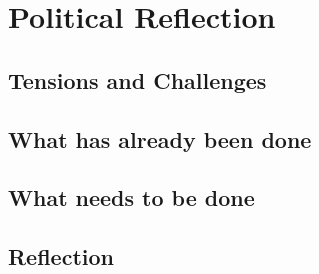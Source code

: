 \section{Political Reflection}
\label{s:poli_reflect}

\subsection{Tensions and Challenges}


\subsection{What has already been done}


\subsection{What needs to be done}

\subsection{Reflection}
